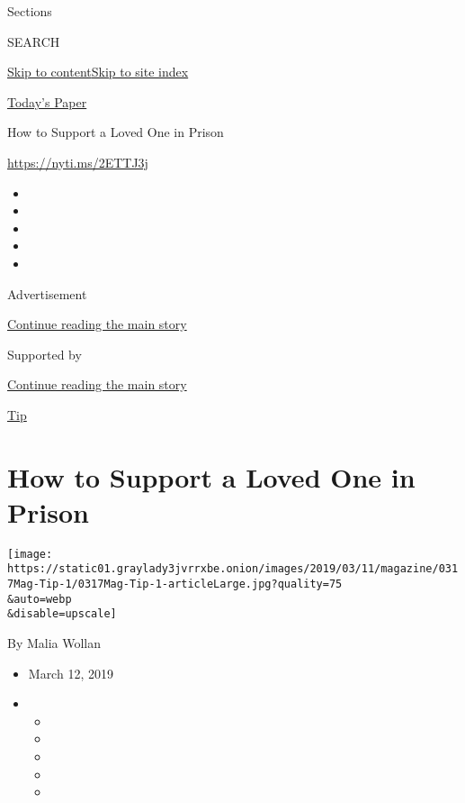 Sections

SEARCH

\protect\hyperlink{site-content}{Skip to
content}\protect\hyperlink{site-index}{Skip to site index}

\href{https://myaccount.nytimes3xbfgragh.onion/auth/login?response_type=cookie\&client_id=vi}{}

\href{https://www.nytimes3xbfgragh.onion/section/todayspaper}{Today's
Paper}

How to Support a Loved One in Prison

\url{https://nyti.ms/2ETTJ3j}

\begin{itemize}
\item
\item
\item
\item
\item
\end{itemize}

Advertisement

\protect\hyperlink{after-top}{Continue reading the main story}

Supported by

\protect\hyperlink{after-sponsor}{Continue reading the main story}

\href{/column/magazine-tip}{Tip}

\hypertarget{how-to-support-a-loved-one-in-prison}{%
\section{How to Support a Loved One in
Prison}\label{how-to-support-a-loved-one-in-prison}}

\texttt{[image: https://static01.graylady3jvrrxbe.onion/images/2019/03/11/magazine/0317Mag-Tip-1/0317Mag-Tip-1-articleLarge.jpg?quality=75\\\&auto=webp\\\&disable=upscale]}

By Malia Wollan

\begin{itemize}
\item
  March 12, 2019
\item
  \begin{itemize}
  \item
  \item
  \item
  \item
  \item
  \end{itemize}
\end{itemize}

